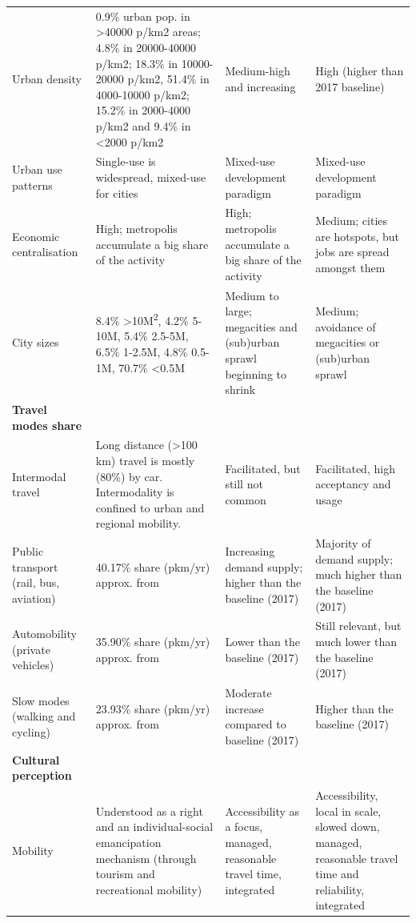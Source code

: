 \begin{landscape}
{\begin{longtable}{p{3cm}p{5cm}p{5cm}p{5cm}}
Urban density & 0.9\% urban pop. in \textgreater40000 p/km2 areas; 4.8\% in 20000-40000 p/km2; 18.3\% in 10000-20000 p/km2, 51.4\% in 4000-10000 p/km2; 15.2\% in 2000-4000 p/km2 and 9.4\% in \textless2000 p/km2 \parencite{cox2017_DemographiaWorldUrban} & Medium-high and increasing & High (higher than 2017 baseline) \\*
Urban use patterns & Single-use is widespread, mixed-use for cities & Mixed-use development paradigm & Mixed-use development paradigm \\*
Economic centralisation & High; metropolis accumulate a big share of the activity & High; metropolis accumulate a big share of the activity & Medium; cities are hotspots, but jobs are spread amongst them \\*
City sizes & 8.4\% \textgreater10M\textsuperscript{2}, 4.2\% 5-10M, 5.4\% 2.5-5M, 6.5\% 1-2.5M, 4.8\% 0.5-1M, 70.7\% \textless0.5M \parencite{cox2017_DemographiaWorldUrban} & Medium to large; megacities and (sub)urban sprawl beginning to shrink & Medium; avoidance of megacities or (sub)urban sprawl \\\addlinespace
\textbf{Travel modes share} &  &  &  \\*
Intermodal travel & Long distance (\textgreater100 km) travel is mostly (80\%) by car. Intermodality is confined to urban and regional mobility. \parencite{riley2010_IntermodalPassengerTransport} & Facilitated, but still not common & Facilitated, high acceptancy and usage \\*
Public transport (rail, bus, aviation) & 40.17\% share (pkm/yr) approx. from \parencite{vuuren2017_Energylanduse} & Increasing demand supply; higher than the baseline (2017) & Majority of demand supply; much higher than the baseline (2017) \\*
Automobility (private vehicles) & 35.90\% share (pkm/yr) approx. from \parencite{vuuren2017_Energylanduse} & Lower than the baseline (2017) & Still relevant, but much lower than the baseline (2017) \\*
Slow modes (walking and cycling) & 23.93\% share (pkm/yr) approx. from \parencite{vuuren2017_Energylanduse} & Moderate increase compared to baseline (2017) & Higher than the baseline (2017) \\\addlinespace
\textbf{Cultural perception} &  &  &  \\*
Mobility & Understood as a right and an individual-social emancipation mechanism (through tourism and recreational mobility) \parencite{sheller2008_MobilityFreedomPublic} & Accessibility as a focus, managed, reasonable travel time, integrated & Accessibility, local in scale, slowed down, managed, reasonable travel time and reliability, integrated \\*

\end{longtable}}
\end{landscape}
